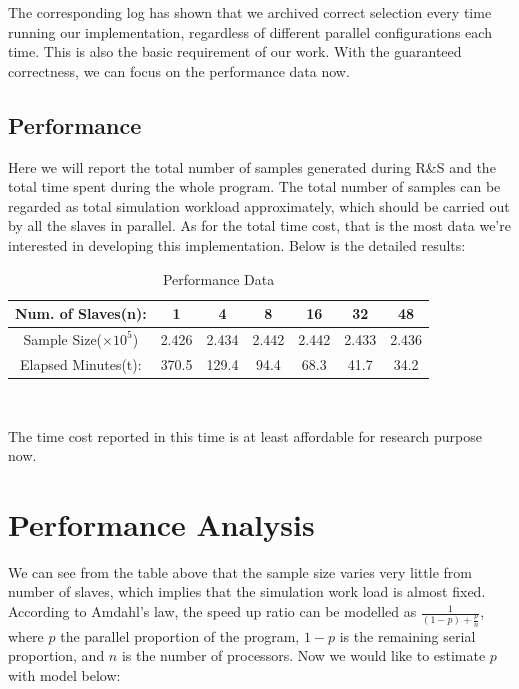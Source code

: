 \documentclass[12pt,a4]{report}
\begin{document}
The corresponding log has shown that we archived correct selection every time running our implementation, regardless of different parallel configurations each time. This is also the basic requirement of our work. With the guaranteed correctness, we can focus on the performance data now.

\subsection{Performance}

Here we will report the total number of samples generated during R\&S and the total time spent during the whole program. The total number of samples can be regarded as total simulation workload approximately, which should be carried out by all the slaves in parallel. As for the total time cost, that is the most data we're interested in developing this implementation. Below is the detailed results:

\begin{table}[ht]
\begin{center}
\begin{tabular}{|c|c|c|c|c|c|c|}
\hline
Num. of Slaves(n): & 1 & 4 & 8 & 16 & 32 & 48 \\
\hline
Sample Size($\times 10^5$) & 2.426 & 2.434 & 2.442 & 2.442 & 2.433 & 2.436\\
\hline
Elapsed Minutes(t): & 370.5 & 129.4 & 94.4 & 68.3 & 41.7 & 34.2 \\
\hline
\end{tabular} \\
\caption{Performance Data}
\end{center}
\end{table}

The time cost reported in this time is at least affordable for research purpose now.

\section{Performance Analysis}

We can see from the table above that the sample size varies very little from number of slaves, which implies that the simulation work load is almost fixed. According to Amdahl's law, the speed up ratio can be modelled as $\frac{1}{(1 - p) + \frac{p}{n}}$, where $p$ the parallel proportion of the program, $1 - p$ is the remaining serial proportion, and $n$ is the number of processors. Now we would like to estimate $p$ with model below:
\end{document}
